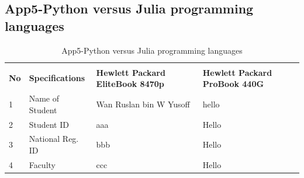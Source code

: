 \begin{landscape}
	\subsection{App5-Python versus Julia programming languages}
	
	\begin{table}[ht]
		\begin{center}
			\caption{App5-Python versus Julia programming languages}		
			\label{tabl2:App5-Python versus Julia programming languages}	
			
			\begin{tabular}{ |p{0.5cm}|p{5.0cm}|p{9.0cm}|p{9.0cm}|}
				\rowcolor{gray!10}			
				\hline \multicolumn{4}{|c|}{\textbf{Python versus Julia programming languages}} \\ [1.0ex]
				\rowcolor{gray!10}
				\hline \textbf{No} & \textbf{Specifications}    & \textbf{Hewlett Packard EliteBook 8470p} & \textbf{Hewlett Packard ProBook 440G}\\ 
				
				\hline 1 & Name of Student    & Wan Ruslan bin W Yusoff & hello\\ 
				\hline 2 & Student ID         &  aaa & Hello\\ 
				\hline 3 & National Reg. ID   & bbb  & Hello\\ 
				\hline 4 & Faculty            & ccc  & Hello\\ 
				
				\hline
			\end{tabular}
		\end{center}
	\end{table}  
	
\end{landscape}
\clearpage
